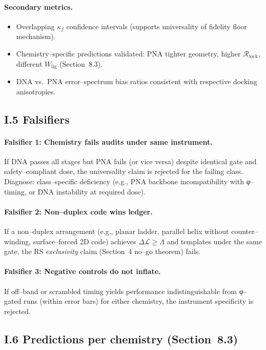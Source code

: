 \documentclass[11pt]{article}
\begin{document}
\paragraph{Secondary metrics.}
\begin{itemize}
\item Overlapping $\kappa_f$ confidence intervals (supports universality of fidelity floor mechanism).
\item Chemistry–specific predictions validated: PNA tighter geometry, higher $\mathcal{R}_{\mathrm{lock}}$, different $W_{\mathrm{lig}}$ (Section~8.3).
\item DNA vs.\ PNA error–spectrum bias ratios consistent with respective docking anisotropies.
\end{itemize}

\subsection*{I.5 Falsifiers}

\paragraph{Falsifier 1: Chemistry fails audits under same instrument.}
If DNA passes all stages but PNA fails (or vice versa) despite identical gate and safety–compliant dose, the universality claim is rejected for the failing class. Diagnose: class–specific deficiency (e.g., PNA backbone incompatibility with φ–timing, or DNA instability at required dose).

\paragraph{Falsifier 2: Non–duplex code wins ledger.}
If a non–duplex arrangement (e.g., planar ladder, parallel helix without counter–winding, surface–forced 2D code) achieves $\Delta\mathcal{L}\ge\Lambda$ and templates under the same gate, the RS \emph{exclusivity} claim (Section~4 no–go theorem) fails.

\paragraph{Falsifier 3: Negative controls do not inflate.}
If off–band or scrambled timing yields performance indistinguishable from φ–gated runs (within error bars) for either chemistry, the instrument specificity is rejected.

\subsection*{I.6 Predictions per chemistry (Section~8.3)}
\end{document}
